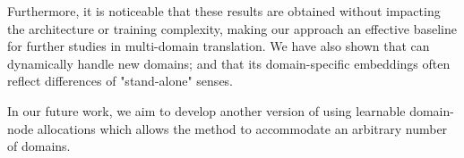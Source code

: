 Furthermore, it is noticeable that these results are obtained without impacting the architecture or training complexity, making our approach an effective baseline for further studies in multi-domain translation. We have also shown that  can dynamically handle new domains; and that its domain-specific embeddings often reflect differences of "stand-alone" senses. 

In our future work, we aim to develop another version of  using learnable domain-node allocations which allows the method to accommodate an arbitrary number of domains.

